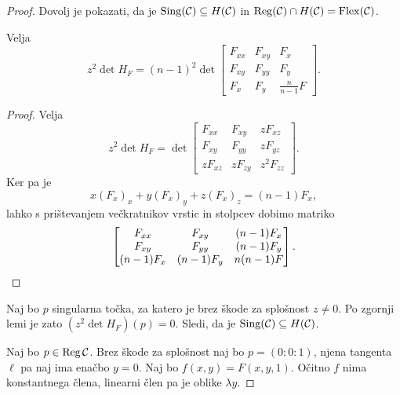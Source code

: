 \begin{proof}
Dovolj je pokazati, da je
$\operatorname{Sing}(\mathcal{C}) \subseteq H(\mathcal{C})$ in
$\operatorname{Reg}(\mathcal{C}) \cap H(\mathcal{C}) = \operatorname{Flex}(\mathcal{C})$.

\begin{lema*}
Velja
\[
z^2 \det H_F =
(n-1)^2 \det \begin{bmatrix}
F_{xx} & F_{xy} & F_x             \\
F_{xy} & F_{yy} & F_y             \\
F_x    & F_y    & \frac{n}{n-1} F
\end{bmatrix}.
\]
\end{lema*}

\begin{proof}
Velja
\[
z^2 \det H_F =
\det \begin{bmatrix}
F_{xx}   & F_{xy}   & z F_{xz}   \\
F_{xy}   & F_{yy}   & z F_{yz}   \\
z F_{xz} & z F_{zy} & z^2 F_{zz}
\end{bmatrix}.
\]
Ker pa je
\[
x (F_x)_x + y (F_x)_y + z (F_x)_z = (n-1) F_x,
\]
lahko s prištevanjem večkratnikov vrstic in stolpcev dobimo matriko
\[
\begin{bmatrix}
F_{xx}       & F_{xy} & (n-1) F_x      \\
F_{xy}       & F_{yy} & (n-1) F_y      \\
(n-1) F_x    & (n-1) F_y    & n(n-1) F
\end{bmatrix}. \qedhere
\]
\end{proof}

Naj bo $p$ singularna točka, za katero je brez škode za splošnost
$z \ne 0$. Po zgornji lemi je zato $(z^2 \det H_F)(p) = 0$. Sledi,
da je $\operatorname{Sing}(\mathcal{C}) \subseteq H(\mathcal{C})$.

Naj bo $p \in \operatorname{Reg} \mathcal{C}$. Brez škode za splošnost naj bo
$p = (0 : 0 : 1)$, njena tangenta $\ell$ pa naj ima enačbo $y = 0$.
Naj bo $f(x,y) = F(x,y,1)$. Očitno $f$ nima konstantnega člena,
linearni člen pa je oblike $\lambda y$.


\end{proof}
